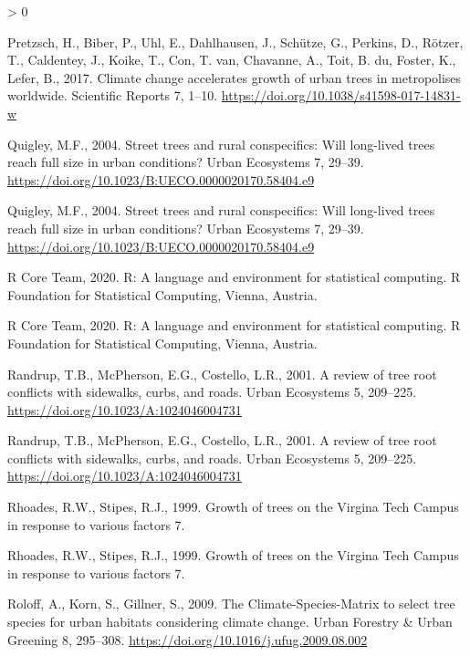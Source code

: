\documentclass[
]{article}
\newlength{\cslhangindent}
\newenvironment{CSLReferences}[2] %
 {%
  \setlength{\parindent}{0pt}
  \ifodd #1 \everypar{\setlength{\hangindent}{\cslhangindent}}\ignorespaces\fi
  \ifnum #2 > 0
  \setlength{\parskip}{#2\baselineskip}
  \fi
 }%
 {}
\begin{document}
\begin{CSLReferences}{1}{0}
\leavevmode\hypertarget{ref-pretzsch2017}{}%
Pretzsch, H., Biber, P., Uhl, E., Dahlhausen, J., Schütze, G., Perkins, D., Rötzer, T., Caldentey, J., Koike, T., Con, T. van, Chavanne, A., Toit, B. du, Foster, K., Lefer, B., 2017. Climate change accelerates growth of urban trees in metropolises worldwide. Scientific Reports 7, 1--10. \url{https://doi.org/10.1038/s41598-017-14831-w}

\leavevmode\hypertarget{ref-quigley2004}{}%
Quigley, M.F., 2004. Street trees and rural conspecifics: {Will} long-lived trees reach full size in urban conditions? Urban Ecosystems 7, 29--39. \url{https://doi.org/10.1023/B:UECO.0000020170.58404.e9}

\leavevmode\hypertarget{ref-quigley2004}{}%
Quigley, M.F., 2004. Street trees and rural conspecifics: {Will} long-lived trees reach full size in urban conditions? Urban Ecosystems 7, 29--39. \url{https://doi.org/10.1023/B:UECO.0000020170.58404.e9}

\leavevmode\hypertarget{ref-rcoreteam2020}{}%
R Core Team, 2020. R: {A} language and environment for statistical computing. {R Foundation for Statistical Computing}, {Vienna, Austria}.

\leavevmode\hypertarget{ref-rcoreteam2020}{}%
R Core Team, 2020. R: {A} language and environment for statistical computing. {R Foundation for Statistical Computing}, {Vienna, Austria}.

\leavevmode\hypertarget{ref-randrup2001}{}%
Randrup, T.B., McPherson, E.G., Costello, L.R., 2001. A review of tree root conflicts with sidewalks, curbs, and roads. Urban Ecosystems 5, 209--225. \url{https://doi.org/10.1023/A:1024046004731}

\leavevmode\hypertarget{ref-randrup2001}{}%
Randrup, T.B., McPherson, E.G., Costello, L.R., 2001. A review of tree root conflicts with sidewalks, curbs, and roads. Urban Ecosystems 5, 209--225. \url{https://doi.org/10.1023/A:1024046004731}

\leavevmode\hypertarget{ref-rhoades1999}{}%
Rhoades, R.W., Stipes, R.J., 1999. Growth of trees on the {Virgina Tech Campus} in response to various factors 7.

\leavevmode\hypertarget{ref-rhoades1999}{}%
Rhoades, R.W., Stipes, R.J., 1999. Growth of trees on the {Virgina Tech Campus} in response to various factors 7.

\leavevmode\hypertarget{ref-roloff2009}{}%
Roloff, A., Korn, S., Gillner, S., 2009. The {Climate}-{Species}-{Matrix} to select tree species for urban habitats considering climate change. Urban Forestry \& Urban Greening 8, 295--308. \url{https://doi.org/10.1016/j.ufug.2009.08.002}


\end{CSLReferences}
\end{document}
